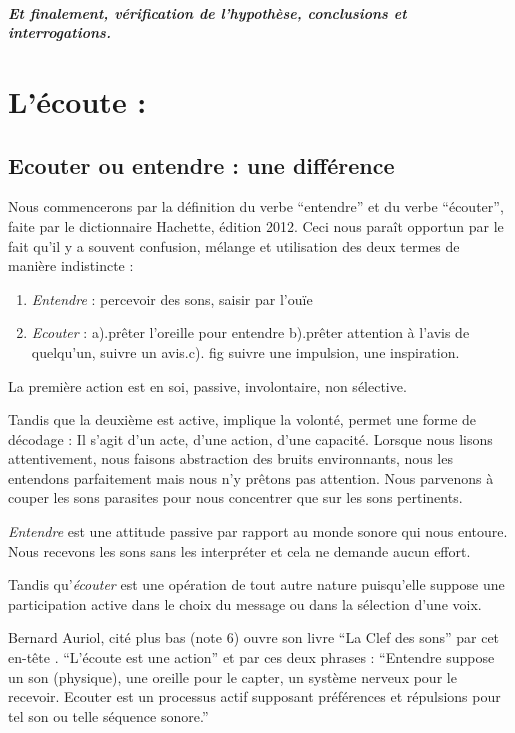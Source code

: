 \documentclass[12pt,french]{report}
\begin{document}
\paragraph{Et finalement, vérification de l'hypothèse, conclusions et interrogations.}

\chapter{L'écoute :}

\section{Ecouter ou entendre : une différence}

Nous commencerons par la définition du verbe ``entendre'' et du
verbe ``écouter'', faite par le dictionnaire Hachette, édition 2012.
Ceci nous paraît opportun par le fait qu'il y a souvent confusion,
mélange et utilisation des deux termes de manière indistincte : 
\begin{enumerate}
\item \emph{Entendre }: percevoir des sons, saisir par l'ouïe
\item \emph{Ecouter} : a).prêter l'oreille pour entendre b).prêter attention
à l'avis de quelqu'un, suivre un avis.c). fig suivre une impulsion,
une inspiration.
\end{enumerate}
La première action est en soi, passive, involontaire, non sélective. 

Tandis que la deuxième est active, implique la volonté, permet une
forme de décodage : Il s'agit d'un acte, d'une action, d'une capacité.\emph{
}Lorsque nous lisons attentivement, nous faisons abstraction des bruits
environnants, nous les entendons parfaitement mais nous n'y prêtons
pas attention. Nous parvenons à couper les sons parasites pour nous
concentrer que sur les sons pertinents.

\emph{Entendre} est une attitude passive par rapport au monde sonore
qui nous entoure. Nous recevons les sons sans les interpréter et cela
ne demande aucun effort.

Tandis qu'\emph{écouter} est une opération de tout autre nature puisqu'elle
suppose une participation active dans le choix du message ou dans
la sélection d'une voix.

Bernard Auriol, cité plus bas (note 6) ouvre son livre ``La Clef
des sons'' par cet en-tête . ``L'écoute est une action'' et par
ces deux phrases : ``Entendre suppose un son (physique), une oreille
pour le capter, un système nerveux pour le recevoir. Ecouter est un
processus actif supposant préférences et répulsions pour tel son ou
telle séquence sonore.''
\end{document}
